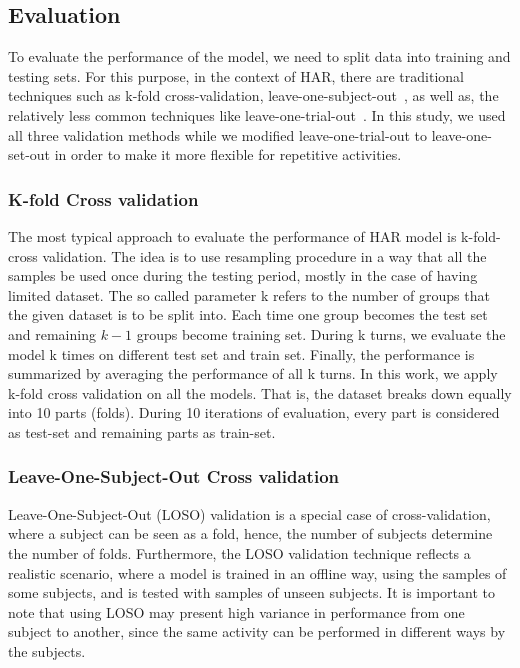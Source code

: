 \documentclass[journal,article,submit,moreauthors,pdftex]{Definitions/mdpi}
\newcommand{\diego}[1]{\textcolor{gray}{{\it [Diego: #1]}}}
\begin{document}
\subsection{Evaluation}
To evaluate the performance of the model, we need to split data into training and testing sets. For this purpose, in the context of HAR, there are traditional techniques such as k-fold cross-validation, leave-one-subject-out~\cite{jordao2018human}, as well as, the relatively less common techniques like leave-one-trial-out~\cite{sena2018multiscale}. In this study, we used all three validation methods while we modified leave-one-trial-out to leave-one-set-out in order to make it more flexible for repetitive activities. 

\subsubsection{K-fold Cross validation}
The most typical approach to evaluate the performance of HAR model is k-fold-cross validation. The idea is to use resampling procedure in a way that all the samples be used once during the testing period, mostly in the case of having limited dataset. The so called parameter k refers to the number of groups that the given dataset is to be split into. Each time one group becomes the test set and remaining $k-1$ groups become training set. During k turns, we evaluate the model k times on different test set and train set. Finally, the performance is summarized by averaging the performance of all k turns. In this work, we apply k-fold cross validation on all the models. That is, the dataset breaks down equally into 10 parts (folds). During 10 iterations of evaluation, every part is considered as test-set and remaining parts as train-set. 
\subsubsection{Leave-One-Subject-Out Cross validation}
Leave-One-Subject-Out (LOSO) validation is a special case of cross-validation, where a subject can be seen as a fold, hence, the number of subjects determine the number of folds. Furthermore, the LOSO validation technique reflects a realistic scenario, where a model is trained in an offline way, using the samples of some subjects, and is tested with samples of unseen subjects. It is important to note that using LOSO may present high variance in performance from one subject to another, since the same activity can be performed in different ways by the subjects. 
\end{document}
